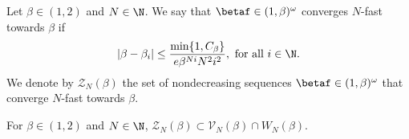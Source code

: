\begin{definition} Let $\beta \in (1,2)$ and $N \in \N$. We say that $\betaf \in (1,\beta)^\omega$ converges $N$-fast towards $\beta$ if 
	\begin{equation}\label{eq:C N fast converging}
		|\beta - \beta_i| \leq \frac{\min\{1,C_\beta\}}{e\beta^{Ni}N^2i^2}, \ \text{for all} \ i \in \N.
	\end{equation}
We denote by $\mathcal Z_N(\beta)$ the set of nondecreasing sequences $\betaf \in (1,\beta)^\omega$ that converge $N$-fast towards $\beta$.
\end{definition}
\begin{lemma}\label{lem:beta C N converging implies bounded error}
	For $\beta \in (1,2)$ and $N \in \N$, $\mathcal Z_N(\beta)\subset \mathcal V_N(\beta) \cap W_N(\beta)$. 
\end{lemma}
